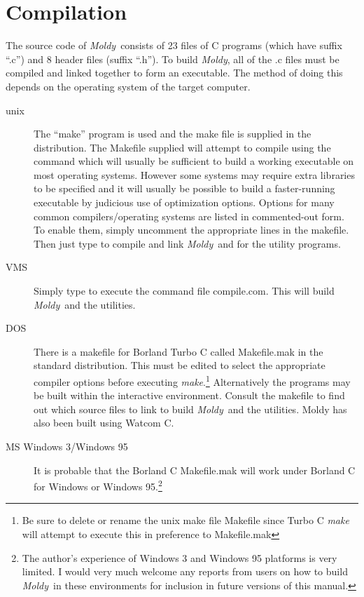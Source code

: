 \documentclass[a4paper,twoside]{report}
\newcommand{\Fname}[1]{{\upshape\mdseries\sffamily#1}}
\newcommand{\moldy}{\emph{Moldy}}
\begin{document}
\section{Compilation}%
The source code of \moldy\  consists of 23 files of C programs (which have
suffix ``\Fname{.c}'') and 8 header files (suffix ``\Fname{.h}'').
To build \moldy, all of the \Fname{.c} files must be compiled and linked
together to form an executable.  The method of doing this depends on
the operating system of the target computer.
\begin{description}
\item[unix]  The ``make'' program is used and the make file is
supplied in the distribution.  The \Fname{Makefile} supplied will attempt
to compile using the command  which will usually
be sufficient to build a working executable on most operating
systems.  However some systems may require extra libraries to
be specified and it will usually be possible to build a faster-running
executable by judicious use of optimization options. Options for many
common compilers/operating systems are listed in commented-out form.
To enable them, simply uncomment the appropriate lines in the makefile.
Then just type  to compile and link \moldy\  and
 for the utility programs.

\item[VMS]  Simply type  to execute the command file
\Fname{compile.com}. This will build \moldy\  and the utilities.

\item[DOS] There is a makefile for Borland Turbo C called
  \Fname{Makefile.mak} in the standard distribution.  This must be
  edited to select the appropriate compiler options before executing
  \emph{make}.\footnote{Be sure to delete or rename the unix make file
    \Fname{Makefile} since Turbo C \emph{make} will attempt to
    execute this in preference to \Fname{Makefile.mak}}
  Alternatively the programs may be built within the interactive
  environment.  Consult the \Fname{makefile} to find out which source
  files to link to build \moldy\ and the utilities.  Moldy has also
  been built using Watcom C.
  
\item[MS Windows 3/Windows 95] It is probable that the Borland C
  \Fname{Makefile.mak} will work under Borland C for Windows or
  Windows 95.\footnote{The author's experience of Windows 3 and
    Windows 95 platforms is very limited.  I would very much welcome
    any reports from users on how to build \moldy\ in these
    environments for inclusion in future versions of this manual.}

\end{description}
\end{document}
